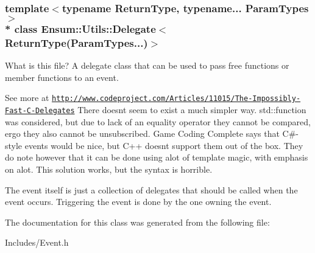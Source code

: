 \subsubsection*{template$<$typename Return\+Type, typename... Param\+Types$>$\\*
class Ensum\+::\+Utils\+::\+Delegate$<$ Return\+Type(\+Param\+Types...)$>$}

What is this file? A delegate class that can be used to pass free functions or member functions to an event. 

See more at \href{http://www.codeproject.com/Articles/11015/The-Impossibly-Fast-C-Delegates}{\tt http\+://www.\+codeproject.\+com/\+Articles/11015/\+The-\/\+Impossibly-\/\+Fast-\/\+C-\/\+Delegates} There doesn\textquotesingle{}t seem to exist a much simpler way. std\+::function was considered, but due to lack of an equality operator they cannot be compared, ergo they also cannot be unsubscribed. Game Coding Complete says that C\#-\/style events would be nice, but C++ doesn\textquotesingle{}t support them out of the box. They do note however that it can be done using alot of template magic, with emphasis on alot. This solution works, but the syntax is horrible.

The event itself is just a collection of delegates that should be called when the event occurs. Triggering the event is done by the one owning the event. 

The documentation for this class was generated from the following file\+:\begin{DoxyCompactItemize}
\item 
Includes/Event.\+h\end{DoxyCompactItemize}
